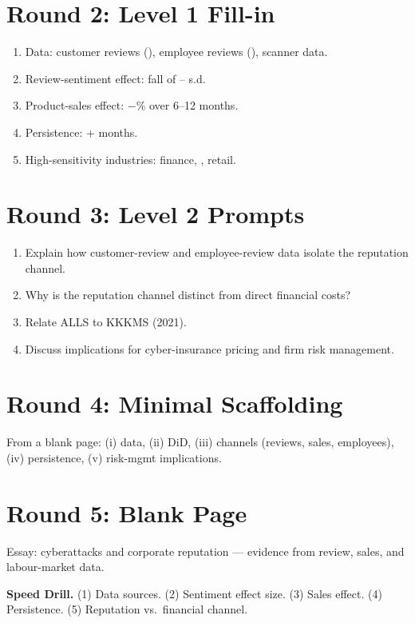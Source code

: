 \documentclass[11pt]{article}
\newcommand{\blank}[1]{\underline{\hspace{#1}}}
\begin{document}
\section*{Round 2: Level 1 Fill-in}
\begin{enumerate}
\item Data: customer reviews (\blank{1.5cm}), employee reviews (\blank{1.5cm}), \blank{1cm} scanner data.
\item Review-sentiment effect: fall of \blank{1cm}--\blank{1cm} s.d.
\item Product-sales effect: $-$\blank{1cm}\% over 6--12 months.
\item Persistence: \blank{1cm}+ months.
\item High-sensitivity industries: finance, \blank{1.5cm}, retail.
\end{enumerate}

\section*{Round 3: Level 2 Prompts}
\begin{enumerate}
\item Explain how customer-review and employee-review data isolate the reputation channel.
\item Why is the reputation channel distinct from direct financial costs?
\item Relate ALLS to KKKMS (2021).
\item Discuss implications for cyber-insurance pricing and firm risk management.
\end{enumerate}

\section*{Round 4: Minimal Scaffolding}
From a blank page: (i) data, (ii) DiD, (iii) channels (reviews, sales, employees), (iv) persistence, (v) risk-mgmt implications.

\section*{Round 5: Blank Page}
Essay: cyberattacks and corporate reputation --- evidence from review, sales, and labour-market data.

\vspace{6pt}
\begin{drillbox}
\textbf{Speed Drill.} (1) Data sources. (2) Sentiment effect size. (3) Sales effect. (4) Persistence. (5) Reputation vs.\ financial channel.
\end{drillbox}
\end{document}

